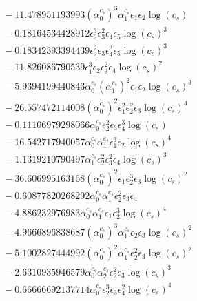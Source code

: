 \documentclass[10pt]{article}
\begin{document}
\begin{align*}
&{}  - 11.478951193993 \left(\alpha_{0}^{c_s}\right)^{3} \alpha_{1}^{c_s} \epsilon_{1} \epsilon_{2} \log{\left(c_{s} \right)} \\
&{}  - 0.18164534428912 \epsilon_{2}^{3} \epsilon_{3}^{2} \epsilon_{4} \epsilon_{5} \log{\left(c_{s} \right)}^{3} \\
&{}  - 0.18342393394439 \epsilon_{2}^{2} \epsilon_{3} \epsilon_{4}^{3} \epsilon_{5} \log{\left(c_{s} \right)}^{3} \\
&{}  - 11.826086790539 \epsilon_{1}^{3} \epsilon_{2} \epsilon_{3}^{2} \epsilon_{4} \log{\left(c_{s} \right)}^{2} \\
&{}  - 5.9394199440843 \alpha_{0}^{c_s} \left(\alpha_{1}^{c_s}\right)^{2} \epsilon_{1} \epsilon_{2} \log{\left(c_{s} \right)}^{3} \\
&{}  - 26.557472114008 \left(\alpha_{0}^{c_s}\right)^{2} \epsilon_{1}^{2} \epsilon_{2}^{2} \epsilon_{3} \log{\left(c_{s} \right)}^{4} \\
&{}  - 0.11106979298066 \alpha_{0}^{c_s} \epsilon_{2}^{2} \epsilon_{3} \epsilon_{4}^{3} \log{\left(c_{s} \right)} \\
&{}  - 16.542717940057 \alpha_{0}^{c_s} \alpha_{1}^{c_s} \epsilon_{1}^{3} \epsilon_{2} \log{\left(c_{s} \right)}^{4} \\
&{}  - 1.1319210790497 \alpha_{1}^{c_s} \epsilon_{2}^{2} \epsilon_{3}^{2} \epsilon_{4} \log{\left(c_{s} \right)}^{3} \\
&{}  - 36.606995163168 \left(\alpha_{0}^{c_s}\right)^{2} \epsilon_{1} \epsilon_{2}^{3} \epsilon_{3} \log{\left(c_{s} \right)}^{2} \\
&{}  - 0.60877820268292 \alpha_{0}^{c_s} \alpha_{1}^{c_s} \epsilon_{2}^{2} \epsilon_{3} \epsilon_{4} \\
&{}  - 4.886232976983 \alpha_{0}^{c_s} \alpha_{1}^{c_s} \epsilon_{1} \epsilon_{2}^{3} \log{\left(c_{s} \right)}^{4} \\
&{}  - 4.9666896838687 \left(\alpha_{0}^{c_s}\right)^{3} \alpha_{1}^{c_s} \epsilon_{2} \epsilon_{3} \log{\left(c_{s} \right)}^{2} \\
&{}  - 5.1002827444992 \left(\alpha_{0}^{c_s}\right)^{2} \alpha_{1}^{c_s} \epsilon_{2}^{2} \epsilon_{3} \log{\left(c_{s} \right)}^{2} \\
&{}  - 2.6310935946579 \alpha_{0}^{c_s} \alpha_{2}^{c_s} \epsilon_{2}^{2} \epsilon_{3} \log{\left(c_{s} \right)}^{3} \\
&{}  - 0.66666692137714 \alpha_{0}^{c_s} \epsilon_{2}^{3} \epsilon_{3} \epsilon_{4}^{2} \log{\left(c_{s} \right)}^{4} \\

\end{align*}
\end{document}

